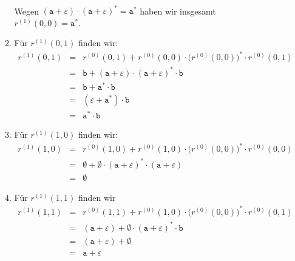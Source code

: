 \begin{enumerate}
\begin{enumerate}
             \\[0.2cm]
             Wegen $(\texttt{a} + \varepsilon)\cdot (\texttt{a} + \varepsilon)^* = \texttt{a}^*$ haben
             wir insgesamt
             \\[0.2cm]
             \hspace*{1.3cm}
             $r^{(1)}(0, 0) = \texttt{a}^*$.
      \item F\"ur $r^{(1)}(0, 1)$ finden wir:
            \begin{eqnarray*}
                  r^{(1)}(0, 1) 
            & = & r^{(0)}(0, 1) + 
                  r^{(0)}(0, 0) \cdot \bigl(r^{(0)}(0, 0)\bigr)^* \cdot r^{(0)}(0, 1) \\
            & = & \texttt{b} + 
                  (\texttt{a} + \varepsilon) \cdot (\texttt{a} + \varepsilon)^* \cdot \texttt{b} \\
            & = & \texttt{b} + \texttt{a}^* \cdot \texttt{b} \\
            & = & (\varepsilon + \texttt{a}^*) \cdot \texttt{b} \\
            & = & \texttt{a}^* \cdot \texttt{b} 
        \end{eqnarray*}
      \item F\"ur $r^{(1)}(1, 0)$ finden wir:
            \begin{eqnarray*}
                  r^{(1)}(1, 0) 
            & = & r^{(0)}(1, 0) + 
                  r^{(0)}(1, 0) \cdot \bigl(r^{(0)}(0, 0)\bigr)^* \cdot r^{(0)}(0, 0) \\
            & = & \emptyset + \emptyset \cdot (\texttt{a} + \varepsilon)^* \cdot (\texttt{a} + \varepsilon) \\
            & = & \emptyset
            \end{eqnarray*}
      \item F\"ur $r^{(1)}(1, 1)$ finden wir
            \begin{eqnarray*}
                  r^{(1)}(1, 1)
            & = & r^{(0)}(1, 1) + 
                  r^{(0)}(1, 0) \cdot \bigl(r^{(0)}(0, 0)\bigr)^* \cdot r^{(0)}(0, 1) \\
            & = & (\texttt{a} + \varepsilon) + 
                  \emptyset \cdot (\texttt{a} + \varepsilon)^* \cdot \texttt{b} \\
            & = & (\texttt{a} + \varepsilon) + \emptyset  \\
            & = & \texttt{a} + \varepsilon  
            \end{eqnarray*}
      \end{enumerate}

\end{enumerate}
